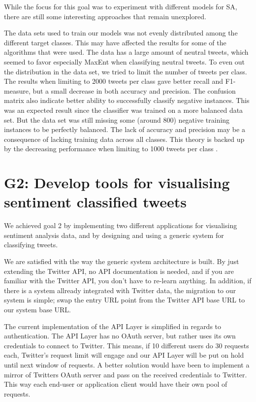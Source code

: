 While the focus for this goal was to experiment with different models for SA, there are still some interesting approaches that remain unexplored. 

The data sets used to train our models was not evenly distributed among the different target classes. This may have affected the results for some of the algorithms that were used. The data has a large amount of neutral tweets, which seemed to favor especially MaxEnt when classifying neutral tweets. To even out the distribution in the data set, we tried to limit the number of tweets per class. The results when limiting to 2000 tweets per class gave better recall and F1-measure, but a small decrease in both accuracy and precision. The confusion matrix also indicate better ability to successfully classify negative instances. This was an expected result since the classifier was trained on a more balanced data set. But the data set was still missing some (around 800) negative training instances to be perfectly balanced. The lack of accuracy and precision may be a consequence of lacking training data across all classes. This theory is backed up by the decreasing performance when limiting to 1000 tweets per class .


\section{G2: Develop tools for visualising sentiment classified tweets}

We achieved goal 2 by implementing two different applications for visualising sentiment analysis data, and by designing and using a generic system for classifying tweets. 

We are satisfied with the way the generic system architecture is built. By just extending the Twitter API, no API documentation is needed, and if you are familiar with the Twitter API, you don't have to re-learn anything. In addition, if there is a system allready integrated with Twitter data, the migration to our system is simple; swap the entry URL point from the Twitter API base URL to our system base URL. 

The current implementation of the API Layer is simplified in regards to authentication. The API Layer has no OAuth server, but rather uses its own credentials to connect to Twitter. This means, if 10 different users do 30 requests each, Twitter's request limit will engage and our API Layer will be put on hold until next window of requests. A better solution would have been to implement a mirror of Twitters OAuth server and pass on the received credentials to Twitter. This way each end-user or application client would have their own pool of requests. 

